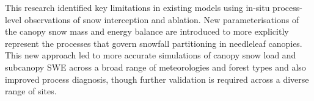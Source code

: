 {This research identified key limitations in existing models using in-situ process-level observations of snow interception and ablation. New parameterisations of the canopy snow mass and energy balance are introduced to more explicitly represent the processes that govern snowfall partitioning in needleleaf canopies. This new approach led to more accurate simulations of canopy snow load and subcanopy SWE across a broad range of meteorologies and forest types and also improved process diagnosis, though further validation is required across a diverse range of sites.
}
